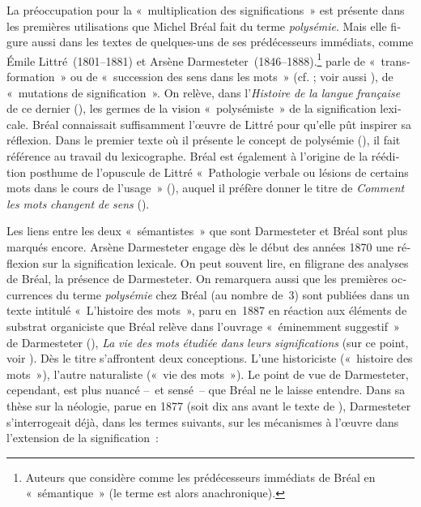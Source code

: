 \documentclass[french,output=paper,colorlinks,citecolor=brown]{../langscibook}
\begin{document}
\begin{otherlanguage}{french}
La préoccupation pour la «~multiplication des significations~» est présente dans les premières utilisations que Michel Bréal fait du terme \textit{polysémie}. Mais elle figure aussi dans les textes de quelques-uns de ses prédécesseurs immédiats, comme Émile Littré~(1801--1881) et Arsène Darmesteter~(1846--1888).\footnote{Auteurs que \citet[1605]{Nerlich2001Development} considère comme les prédécesseurs immédiats de Bréal en «~sémantique~» (le terme est alors anachronique).} \citet[11--12]{Darmesteter1874} parle de «~transformation~» ou de «~succession des sens dans les mots~» (cf. \citealt{Darmesteter1876}; voir aussi \citealt{Bailly1874}), \citet[1]{Littré1880} de «~mutations de signification~». On relève, dans l’\textit{Histoire} \textit{de} \textit{la} \textit{langue} \textit{française} de ce dernier (\citealt{Littré1863}), les germes de la vision «~polysémiste~» de la signification lexicale. Bréal connaissait suffisamment l’œuvre de Littré pour qu’elle pût inspirer sa réflexion. Dans le premier texte où il présente le concept de polysémie (\citealt{Bréal1887}), il fait référence au travail du lexicographe. Bréal est également à l’origine de la réédition posthume de l’opuscule de Littré «~Pathologie verbale ou lésions de certains mots dans le cours de l’usage~» (\citealt{Littré1880}), auquel il préfère donner le titre de \textit{Comment} \textit{les} \textit{mots} \textit{changent} \textit{de} \textit{sens} (\citealt{Littré1888}).

Les liens entre les deux «~sémantistes~» que sont Darmesteter et Bréal sont plus marqués encore. Arsène Darmesteter engage dès le début des années 1870 une réflexion sur la signification lexicale. On peut souvent lire, en filigrane des analyses de Bréal, la présence de Darmesteter. On remarquera aussi que les premières occurrences du terme \textit{polysémie} chez Bréal (au nombre de~3) sont publiées dans un texte intitulé «~L’histoire des mots~», paru en~1887 en réaction aux éléments de substrat organiciste que Bréal relève dans l’ouvrage «~éminemment suggestif~» de Darmesteter (\citealt[469]{Meyer1888}), \textit{La} \textit{vie} \textit{des} \textit{mots} \textit{étudiée} \textit{dans} \textit{leurs} \textit{significations} (sur ce point, voir \citealt{Delesalle1987}). Dès le titre s’affrontent deux conceptions. L’une historiciste («~histoire des mots~»), l’autre naturaliste («~vie des mots~»). Le point de vue de Darmesteter, cependant, est plus nuancé –~et sensé~– que Bréal ne le laisse entendre. Dans sa thèse sur la néologie, parue en 1877 (soit dix ans avant le texte de \citeauthor{Bréal1887}), Darmesteter s’interrogeait déjà, dans les termes suivants, sur les mécanismes à l’œuvre dans l’extension de la signification~:


\end{otherlanguage}
\end{document}
